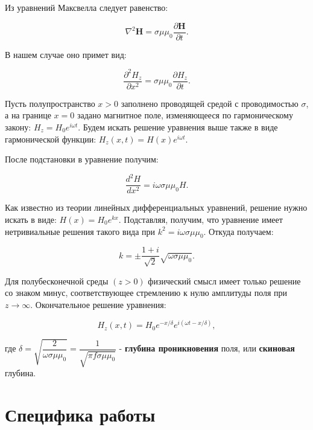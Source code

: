 	
	\noindent Из уравнений Максвелла следует равенство:
	
	\begin{equation}
		\nabla^2\boldsymbol{H} = \sigma\mu\mu_0\dfrac{\partial\boldsymbol{H}}{\partial t}.
	\end{equation}
	
	\noindent В нашем случае оно примет вид:
	
	\begin{equation}
		\dfrac{\partial^2 H_z}{\partial x^2} = \sigma\mu\mu_0 \dfrac{\partial H_z}{\partial t}.
	\end{equation} 

	\noindent Пусть полупространство $x > 0$ заполнено проводящей средой с проводимостью $\sigma$, а на границе $x = 0$ задано магнитное поле, изменяющееся по гармоническому закону: $H_z = H_0 e^{i\omega t}$. Будем искать решение уравнения выше также в виде гармонической функции: $H_z(x, t) = H(x)e^{i\omega t}$.
	
	\noindent После подстановки в уравнение получим:
	
	\begin{equation}
		\dfrac{d^2 H}{dx^2} = i\omega\sigma\mu\mu_0H.
		\label{H_diff}
	\end{equation}

	\noindent Как известно из теории линейных дифференциальных уравнений,
	решение нужно искать в виде: $H(x) = H_0 e^{k x}$. Подставляя, получим,
	что уравнение имеет нетривиальные решения такого вида при $k^2 = i\omega\sigma\mu\mu_0$. Откуда получаем:
	
	\begin{equation}
		k = \pm \dfrac{1+i}{\sqrt{2}}\sqrt{\omega\sigma\mu\mu_0}.
	\end{equation}

	\noindent Для полубесконечной среды $(z > 0)$ физический смысл имеет только решение со знаком минус, соответствующее стремлению к нулю амплитуды поля при $z \rightarrow \infty$. Окончательное решение уравнения:
	
	\begin{equation}
		H_z(x, t) = H_0e^{-x/\delta}e^{i(\omega t - x/\delta)},
	\end{equation}

	\noindent где $\delta = \sqrt{\dfrac{2}{\omega\sigma\mu\mu_0}} = \dfrac{1}{\sqrt{\pi f \sigma\mu\mu_0}}$ - \textbf{глубина проникновения} поля, или \textbf{скиновая} глубина.
	
	\newpage

	\section*{Специфика работы}
	
